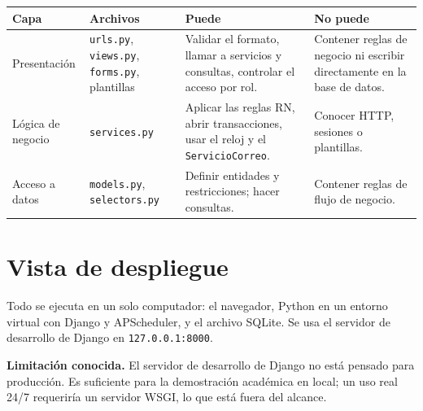 \begin{longtable}{>{\raggedright\arraybackslash}p{2.6cm}>{\raggedright\arraybackslash}p{3.6cm}>{\raggedright\arraybackslash}p{4.2cm}>{\raggedright\arraybackslash}p{4cm}}
\toprule
\textbf{Capa} & \textbf{Archivos} & \textbf{Puede} & \textbf{No puede}\\
\midrule\endhead
Presentación & \texttt{urls.py}, \texttt{views.py}, \texttt{forms.py}, plantillas & Validar el formato, llamar a servicios y consultas, controlar el acceso por rol. & Contener reglas de negocio ni escribir directamente en la base de datos.\\
Lógica de negocio & \texttt{services.py} & Aplicar las reglas RN, abrir transacciones, usar el reloj y el \texttt{ServicioCorreo}. & Conocer HTTP, sesiones o plantillas.\\
Acceso a datos & \texttt{models.py}, \texttt{selectors.py} & Definir entidades y restricciones; hacer consultas. & Contener reglas de flujo de negocio.\\
\bottomrule
\end{longtable}

\section{Vista de despliegue}
Todo se ejecuta en un solo computador: el navegador, Python en un entorno virtual con Django y APScheduler, y el archivo SQLite. Se usa el servidor de desarrollo de Django en \texttt{127.0.0.1:8000}.

\textbf{Limitación conocida.} El servidor de desarrollo de Django no está pensado para producción. Es suficiente para la demostración académica en local; un uso real 24/7 requeriría un servidor WSGI, lo que está fuera del alcance.

